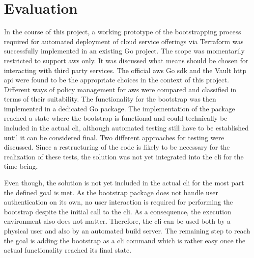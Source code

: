 \chapter{Evaluation}
In the course of this project, a working prototype of the bootstrapping process required for automated deployment of cloud service offerings via Terraform was successfully implemented in an existing Go project.
The scope was momentarily restricted to support \ac{aws} only.
It was discussed what means should be chosen for interacting with third party services.
The official \ac{aws} Go \ac{sdk} and the Vault \ac{http} \ac{api} were found to be the appropriate choices in the context of this project.
Different ways of policy management for \ac{aws} were compared and classified in terms of their suitability.
The functionality for the bootstrap was then implemented in a dedicated Go package.
The implementation of the package reached a state where the bootstrap is functional and could technically be included in the actual \ac{cli}, although automated testing still have to be established until it can be considered final.
Two different approaches for testing were discussed.
Since a restructuring of the code is likely to be necessary for the realization of these tests, the solution was not yet integrated into the \ac{cli} for the time being.

Even though, the solution is not yet included in the actual \ac{cli} for the most part the defined goal is met.
As the bootstrap package does not handle user authentication on its own, no user interaction is required for performing the bootstrap despite the initial call to the \ac{cli}.
As a consequence, the execution environment also does not matter.
Therefore, the \ac{cli} can be used both by a physical user and also by an automated build server.
The remaining step to reach the goal is adding the bootstrap as a \ac{cli} command which is rather easy once the actual functionality reached its final state.



